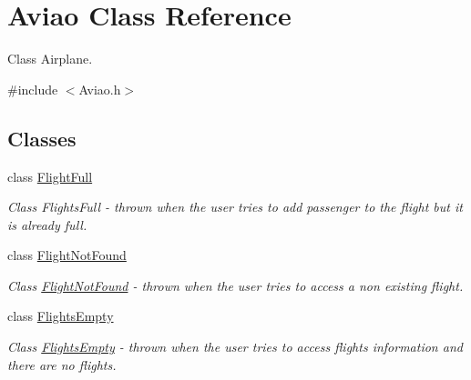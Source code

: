 \hypertarget{class_aviao}{}\section{Aviao Class Reference}
\label{class_aviao}


Class Airplane.  




{\ttfamily \#include $<$Aviao.\+h$>$}

\subsection*{Classes}
\begin{DoxyCompactItemize}
\item 
class \hyperlink{class_aviao_1_1_flight_full}{Flight\+Full}
\begin{DoxyCompactList}\small\item\em Class Flights\+Full -\/ thrown when the user tries to add passenger to the flight but it is already full. \end{DoxyCompactList}\item 
class \hyperlink{class_aviao_1_1_flight_not_found}{Flight\+Not\+Found}
\begin{DoxyCompactList}\small\item\em Class \hyperlink{class_aviao_1_1_flight_not_found}{Flight\+Not\+Found} -\/ thrown when the user tries to access a non existing flight. \end{DoxyCompactList}\item 
class \hyperlink{class_aviao_1_1_flights_empty}{Flights\+Empty}
\begin{DoxyCompactList}\small\item\em Class \hyperlink{class_aviao_1_1_flights_empty}{Flights\+Empty} -\/ thrown when the user tries to access flights information and there are no flights. \end{DoxyCompactList}\end{DoxyCompactItemize}
